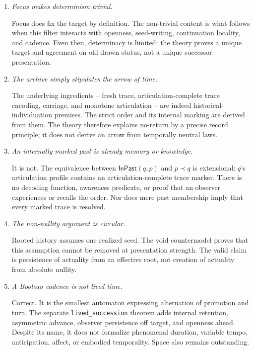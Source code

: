 \documentclass[11pt]{article}
\theoremstyle{definition}
\theoremstyle{remark}
\newcommand{\lean}[1]{\nolinkurl{#1}}
\begin{document}
\begin{enumerate}[label=\textbf{O\arabic*.}, leftmargin=*, align=left]
  \item \emph{Focus makes determinism trivial.}

  Focus does fix the target by definition. The non-trivial content is what
  follows when this filter interacts with openness, seed-writing, continuation
  locality, and cadence. Even then, determinacy is limited: the theory proves a
  unique target and agreement on old drawn status, not a unique successor
  presentation.

  \item \emph{The archive simply stipulates the arrow of time.}

  The underlying ingredients -- fresh trace, articulation-complete trace encoding,
  carriage, and monotone articulation -- are indeed
  historical-individuation premises. The strict order and its internal
  marking are derived from them. The theory therefore explains no-return
  by a precise record principle; it does not derive an arrow from temporally
neutral laws.

  \item \emph{An internally marked past is already memory or knowledge.}

  It is not. The equivalence between \(\mathsf{InPast}(q,p)\) and \(p\prec q\)
  is extensional: \(q\)'s articulation profile contains an
  articulation-complete trace marker. There is no decoding function,
  awareness predicate, or proof that an observer experiences or recalls the
  order. Nor does mere past membership imply that every marked trace is
  resolved.

  \item \emph{The non-nullity argument is circular.}

  Rooted history assumes one realized seed. The void countermodel proves that
  this assumption cannot be removed at presentation strength. The valid claim
  is persistence of actuality from an effective root, not creation of
  actuality from absolute nullity.

  \item \emph{A Boolean cadence is not lived time.}

  Correct. It is the smallest automaton expressing alternation of promotion and
  turn. The separate \lean{lived_succession} theorem adds internal retention,
  asymmetric advance, observer persistence off target, and openness ahead.
  Despite its name, it does not formalize phenomenal duration, variable tempo,
  anticipation, affect, or embodied temporality. Space also remains
  outstanding.


\end{enumerate}
\end{document}
